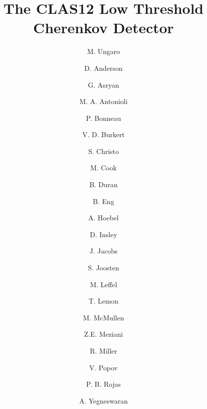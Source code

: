 \title{The CLAS12 Low Threshold Cherenkov Detector}


\author[A]{M. Ungaro}       %
\author[A]{D. Anderson}     %
\author[A]{G. Asryan}       %
\author[A]{M. A. Antonioli} %
\author[A]{P. Bonneau}      %
\author[A]{V. D. Burkert}   %
\author[A]{S. Christo}      %
\author[A]{M. Cook}         %
\author[B]{B. Duran}        %
\author[A]{B. Eng}          %
\author[A]{A. Hoebel}       %
\author[A]{D. Insley}       %
\author[A]{J. Jacobs}       %
\author[C]{S. Joosten}      %
\author[A]{M. Leffel}       %
\author[A]{T. Lemon}        %
\author[A]{M. McMullen}     %
\author[C]{Z.E. Meziani}    %
\author[A]{R. Miller}       %
\author[A]{V. Popov}        %
\author[A]{P. B. Rojas}     %
\author[A]{A. Yegneswaran}  %


\address[A]{Thomas Jefferson National Accelerator Facility, Newport News, VA, USA}
\address[B]{Temple University, Philadelphia, PA, USA}
\address[C]{Argonne National Laboratory, Lemont, IL, USA}
